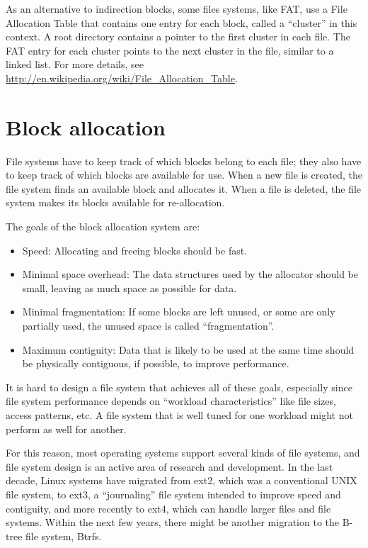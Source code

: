 \documentclass[12pt]{book}
\begin{document}
{As an alternative to indirection blocks, some files systems, like FAT,
use a File Allocation Table that contains one entry for each block,
called a ``cluster'' in this context.  A root directory contains a
pointer to the first cluster in each file.  The FAT entry for each
cluster points to the next cluster in the file, similar to a linked
list.  For more details, see
\url{http://en.wikipedia.org/wiki/File_Allocation_Table}.


\section{Block allocation}

File systems have to keep track of which blocks belong to each file;
they also have to keep track of which blocks are available for use.
When a new file is created, the file system finds an available
block and allocates it.  When a file is deleted, the file system
makes its blocks available for re-allocation.

The goals of the block allocation system are:

\begin{itemize}

\item Speed: Allocating and freeing blocks should be fast.

\item Minimal space overhead: The data structures used by the allocator
  should be small, leaving as much space as possible for data.

\item Minimal fragmentation: If some blocks are left unused, or some
  are only partially used, the unused space is called
  ``fragmentation''.

\item Maximum contiguity: Data that is likely to be used at the same
  time should be physically contiguous, if possible, to improve
  performance.

\end{itemize}

It is hard to design a file system that achieves all of these
goals, especially since file system performance depends on
``workload characteristics'' like file sizes, access
patterns, etc.  A file system that is well tuned for one workload
might not perform as well for another.

For this reason, most operating systems support several kinds of file
systems, and file system design is an active area of research and
development.  In the last decade, Linux systems have migrated
from ext2, which was a conventional UNIX file system, to ext3,
a ``journaling'' file system intended to improve speed and
contiguity, and more recently to ext4, which can handle larger files
and file systems.  Within the next few years, there might be
another migration to the B-tree file system, Btrfs.


}
\end{document}

